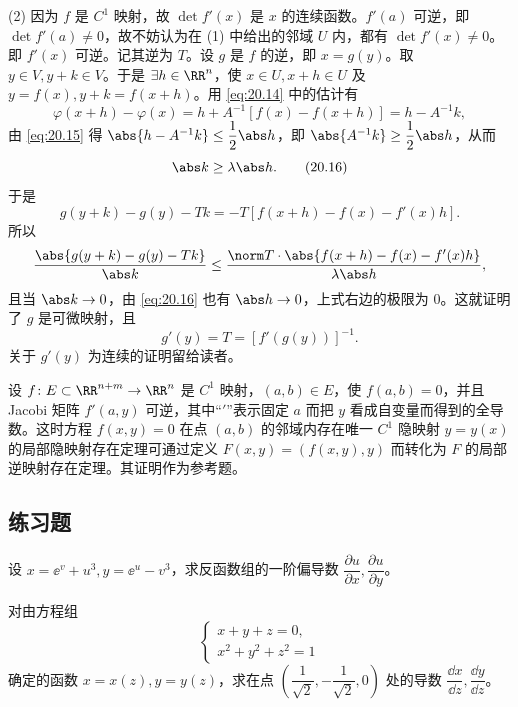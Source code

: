 \begin{xproof}
(2) 因为 $f$ 是 $C^1$ 映射，故 $\det f'(x)$ 是 $x$ 的连续函数。$f'(a)$ 可逆，即 $\det f'(a)\ne0$，故不妨认为在 (1) 中给出的邻域 $U$ 内，都有 $\det f'(x)\ne0$。即 $f'(x)$ 可逆。记其逆为 $T$。设 $g$ 是 $f$ 的逆，即 $x=g(y)$。取 $y\in V,y+k\in V$。于是 $\exists h\in\RR^n$，使 $x\in U,x+h\in U$ 及 $y=f(x),y+k=f(x+h)$。用 \eqref{eq:20.14} 中的估计有
\[
  \varphi(x+h)-\varphi(x)=h+A^{-1}[f(x)-f(x+h)]=h-A^{-1}k,
\]
由 \eqref{eq:20.15} 得 $\abs{h-A^{-1}k}\le\dfrac12\abs h$，即 $\abs{A^{-1}k}\ge\dfrac12\abs h$，从而
\begin{equation}
  \abs k\ge\lambda\abs h.
  \tag{20.16}
  \label{eq:20.16}
\end{equation}
于是
\[
  g(y+k)-g(y)-Tk=-T[f(x+h)-f(x)-f'(x)h].
\]
所以
\[
  \frac{\abs{g(y+k)-g(y)-Tk}}{\abs k}
  \le
  \frac{\norm T\cdot\abs{f(x+h)-f(x)-f'(x)h}}{\lambda\abs h},
\]
且当 $\abs k\to0$，由 \eqref{eq:20.16} 也有 $\abs h\to0$，上式右边的极限为 0。这就证明了 $g$ 是可微映射，且
\[
  g'(y)=T=[f'(g(y))]^{-1}.
\]
关于 $g'(y)$ 为连续的证明留给读者。
\end{xproof}

\begin{xremark}
设 $f\colon E\subset\RR^{n+m}\to\RR^n$ 是 $C^1$ 映射，$(a,b)\in E$，使 $f(a,b)=0$，并且 Jacobi 矩阵 $f'(a,y)$ 可逆，其中“$'$”表示固定 $a$ 而把 $y$ 看成自变量而得到的全导数。这时方程 $f(x,y)=0$ 在点 $(a,b)$ 的邻域内存在唯一 $C^1$ 隐映射 $y=y(x)$ 的局部隐映射存在定理可通过定义 $F(x,y)=(f(x,y),y)$ 而转化为 $F$ 的局部逆映射存在定理。其证明作为参考题。
\end{xremark}

\subsection{练习题}

\begin{xexercise}[1]
设 $x=\ee^v+u^3,y=\ee^u-v^3$，求反函数组的一阶偏导数 $\dfrac{\partial u}{\partial x},\dfrac{\partial u}{\partial y}$。
\end{xexercise}

\begin{xexercise}[2]
对由方程组
  \[
    \begin{cases}
      x+y+z=0,\\
      x^2+y^2+z^2=1
    \end{cases}
  \]
  确定的函数 $x=x(z),y=y(z)$，求在点 $\left(\dfrac1{\sqrt2},-\dfrac1{\sqrt2},0\right)$ 处的导数 $\dfrac{\dd x}{\dd z},\dfrac{\dd y}{\dd z}$。
\end{xexercise}

